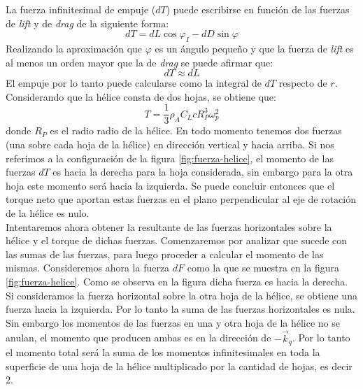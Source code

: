 \documentclass[main]{subfiles}
\begin{document}
La fuerza infinitesimal de empuje ($dT$) puede escribirse en funci\'on de las fuerzas de \emph{lift} y de \emph{drag} de la siguiente forma:
\begin{equation}
dT=dL\cos\varphi_I-dD\sin\varphi
\end{equation}
Realizando la aproximaci\'on que $\varphi$ es un \'angulo peque\~no y que la fuerza de \emph{lift} es al menos un orden mayor que la de \emph{drag} se puede afirmar que:
\begin{equation}
dT\approx dL
\end{equation}
El empuje por lo tanto puede calcularse como la integral de $dT$ respecto de $r$. Considerando que la h\'elice consta de dos hojas, se obtiene que:
\begin{equation}
\label{eq:fuerza}
T=\frac{1}{3}\rho_A C_L c R_P^3\omega_p^2
\end{equation}
donde $R_P$ es el radio radio de la h\'elice. En todo momento tenemos dos fuerzas (una sobre cada hoja de la h\'elice) en direcci\'on vertical y hacia arriba. Si nos referimos a la configuraci\'on de la figura \ref{fig:fuerza-helice}, el momento de las fuerzas $dT$ es hacia la derecha para la hoja considerada, sin embargo para la otra hoja este momento ser\'a hacia la izquierda. Se puede concluir entonces que el torque neto que aportan estas fuerzas en el plano perpendicular al eje de rotaci\'on de la h\'elice es nulo.\\

Intentaremos ahora obtener la resultante de las fuerzas horizontales sobre la h\'elice y el torque de dichas fuerzas. Comenzaremos por analizar que sucede con las sumas de las fuerzas, para luego proceder a calcular el momento de las mismas. Consideremos ahora la fuerza $dF$ como la que se muestra en la figura \ref{fig:fuerza-helice}. Como se observa en la figura dicha fuerza es hacia la derecha. Si consideramos la fuerza horizontal sobre la otra hoja de la h\'elice, se obtiene una fuerza hacia la izquierda. Por lo tanto la suma de las fuerzas horizontales es nula. Sin embargo los momentos de las fuerzas en una y otra hoja de la h\'elice no se anulan, el momento que producen ambas es en la direcci\'on de $-\vec{k}_q$. Por lo tanto el momento total ser\'a la suma de los momentos infinitesimales en toda la superficie de una hoja de la h\'elice multiplicado por la cantidad de hojas, es decir 2. 
\end{document}
